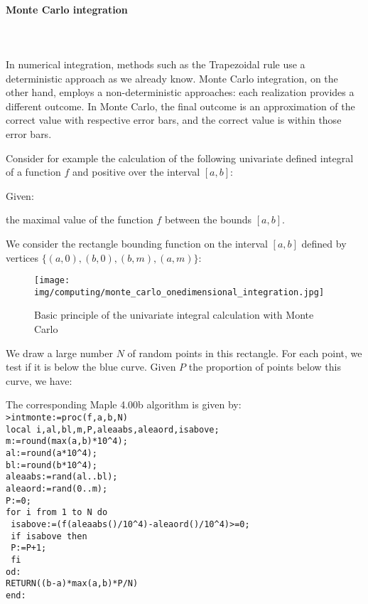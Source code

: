 	\pagebreak
	\paragraph{Monte Carlo integration}\label{monte carlo integration}\mbox{}\\\\
	In numerical integration, methods such as the Trapezoidal rule use a deterministic approach as we already know. Monte Carlo integration, on the other hand, employs a non-deterministic approaches: each realization provides a different outcome. In Monte Carlo, the final outcome is an approximation of the correct value with respective error bars, and the correct value is within those error bars.
	
	Consider for example the calculation of the following univariate defined integral of a function $f$ and positive over the interval $[a, b]$:
	
	Given:
	
	the maximal value of the function $f$ between the bounds $[a,b]$.

	We consider the rectangle bounding function on the interval $[a, b]$ defined by vertices $\{(a,0),(b,0),(b,m),(a,m)\}$:
	\begin{figure}[H]
		\centering
		\texttt{[image: img/computing/monte\_carlo\_onedimensional\_integration.jpg]}
		\caption{Basic principle of the univariate integral calculation with Monte Carlo}
	\end{figure}
	We draw a large number $N$ of random points in this rectangle. For each point, we test if it is below the blue curve. Given $P$ the proportion of points below this curve, we have:
	
	The corresponding Maple 4.00b algorithm  is given by:\\
	
	\texttt{>intmonte:=proc(f,a,b,N)}\\
	\texttt{local i,al,bl,m,P,aleaabs,aleaord,isabove;}\\
	\texttt{m:=round(max(a,b)*10\string^4);}\\
	\texttt{al:=round(a*10\string^4);}\\
	\texttt{bl:=round(b*10\string^4);}\\
	\texttt{aleaabs:=rand(al..bl);}\\
	\texttt{aleaord:=rand(0..m);}\\
	\texttt{P:=0;}\\
	\texttt{for i from 1 to N do}\\
	\texttt{     isabove:=(f(aleaabs()/10\string^4)-aleaord()/10\string^4)>=0;}\\
	\texttt{     if isabove then}\\
	\texttt{          P:=P+1;}\\
	\texttt{     fi}\\
	\texttt{od:}\\
	\texttt{RETURN((b-a)*max(a,b)*P/N)}\\
	\texttt{end:}\\
	
